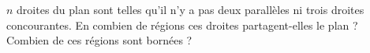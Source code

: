 $n$ droites du plan sont telles qu'il n'y a pas deux parallèles ni trois droites concourantes. En combien de régions ces droites partagent-elles le plan ? Combien de ces régions sont bornées ?
